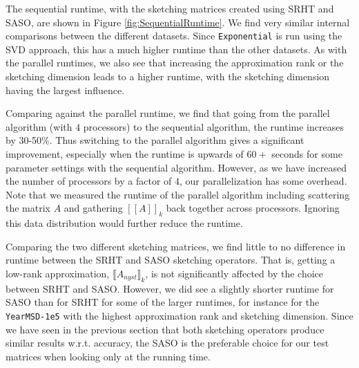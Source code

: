 \documentclass{article}
\theoremstyle{definition}
\begin{document}
The sequential runtime, with the sketching matrices created using SRHT and SASO,
are shown in Figure \ref{fig:SequentialRuntime}. We find very similar internal
comparisons between the different datasets. Since \texttt{Exponential} is run
using the SVD approach, this has a much higher runtime than the other datasets.
As with the parallel runtimes, we also see that increasing the approximation
rank or the sketching dimension leads to a higher runtime, with the sketching
dimension having the largest influence.

Comparing against the parallel runtime, we find that going from the parallel
algorithm (with $4$ processors) to the sequential algorithm, the runtime
increases by 30-50\%. Thus switching to the parallel algorithm gives a
significant improvement, especially when the runtime is upwards of $60+$ seconds
for some parameter settings with the sequential algorithm. However, as we have
increased the number of processors by a factor of $4$, our parallelization has
some overhead. Note that we measured the runtime of the parallel algorithm
including scattering the matrix $A$ and gathering $[\![A]\!]_k$ back together
across processors. Ignoring this data distribution would further reduce the
runtime.

Comparing the two different sketching matrices, we find little to no difference
in runtime between the SRHT and SASO sketching operators. That is, getting a
low-rank approximation, $\llbracket A_{nyst}\rrbracket_k$, is not significantly
affected by the choice between SRHT and SASO. However, we did see a slightly
shorter runtime for SASO than for SRHT for some of the larger runtimes, for
instance for the \texttt{YearMSD-1e5} with the highest approximation rank and
sketching dimension. Since we have seen in the previous section that both
sketching operators produce similar results w.r.t. accuracy, the SASO is the
preferable choice for our test matrices when looking only at the running time.
\end{document}
